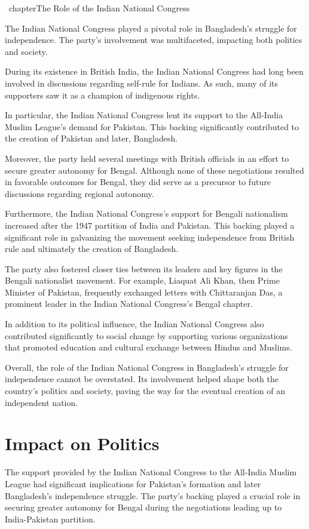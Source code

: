 \ chapter{The Role of the Indian National Congress}

The Indian National Congress played a pivotal role in Bangladesh's struggle for independence. The party's involvement was multifaceted, impacting both politics and society.

During its existence in British India, the Indian National Congress had long been involved in discussions regarding self-rule for Indians. As such, many of its supporters saw it as a champion of indigenous rights.

In particular, the Indian National Congress lent its support to the All-India Muslim League's demand for Pakistan. This backing significantly contributed to the creation of Pakistan and later, Bangladesh.

Moreover, the party held several meetings with British officials in an effort to secure greater autonomy for Bengal. Although none of these negotiations resulted in favorable outcomes for Bengal, they did serve as a precursor to future discussions regarding regional autonomy.

Furthermore, the Indian National Congress's support for Bengali nationalism increased after the 1947 partition of India and Pakistan. This backing played a significant role in galvanizing the movement seeking independence from British rule and ultimately the creation of Bangladesh.

The party also fostered closer ties between its leaders and key figures in the Bengali nationalist movement. For example, Liaquat Ali Khan, then Prime Minister of Pakistan, frequently exchanged letters with Chittaranjan Das, a prominent leader in the Indian National Congress's Bengal chapter.

In addition to its political influence, the Indian National Congress also contributed significantly to social change by supporting various organizations that promoted education and cultural exchange between Hindus and Muslims.

Overall, the role of the Indian National Congress in Bangladesh's struggle for independence cannot be overstated. Its involvement helped shape both the country's politics and society, paving the way for the eventual creation of an independent nation.

\section{Impact on Politics}

The support provided by the Indian National Congress to the All-India Muslim League had significant implications for Pakistan's formation and later Bangladesh's independence struggle. The party's backing played a crucial role in securing greater autonomy for Bengal during the negotiations leading up to India-Pakistan partition.

